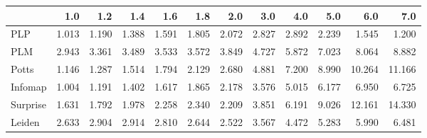 \begin{tabular}{lrrrrrrrrrrr}
\toprule
{} &   1.0 &   1.2 &   1.4 &   1.6 &   1.8 &   2.0 &   3.0 &   4.0 &   5.0 &    6.0 &    7.0 \\
\midrule
PLP      & 1.013 & 1.190 & 1.388 & 1.591 & 1.805 & 2.072 & 2.827 & 2.892 & 2.239 &  1.545 &  1.200 \\
PLM      & 2.943 & 3.361 & 3.489 & 3.533 & 3.572 & 3.849 & 4.727 & 5.872 & 7.023 &  8.064 &  8.882 \\
Potts    & 1.146 & 1.287 & 1.514 & 1.794 & 2.129 & 2.680 & 4.881 & 7.200 & 8.990 & 10.264 & 11.166 \\
Infomap  & 1.004 & 1.191 & 1.402 & 1.617 & 1.865 & 2.178 & 3.576 & 5.015 & 6.177 &  6.950 &  6.725 \\
Surprise & 1.631 & 1.792 & 1.978 & 2.258 & 2.340 & 2.209 & 3.851 & 6.191 & 9.026 & 12.161 & 14.330 \\
Leiden   & 2.633 & 2.904 & 2.914 & 2.810 & 2.644 & 2.522 & 3.567 & 4.472 & 5.283 &  5.990 &  6.481 \\
\bottomrule
\end{tabular}
